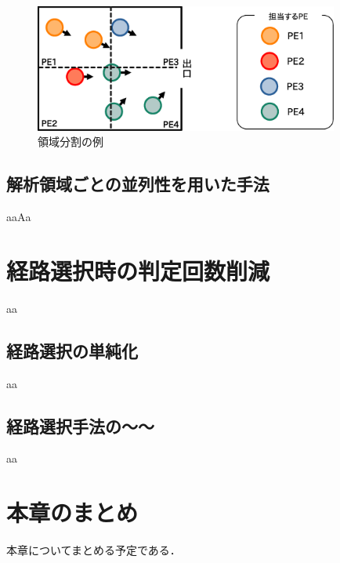 \begin{figure}[hbtp]
 \begin{center}
  \includegraphics[width=10cm,clip]{figure/ryoiki_heiretu.eps}
  \caption{領域分割の例}
  \label{fig:atigenshou}
 \end{center}
\end{figure}


\clearpage

\subsection{解析領域ごとの並列性を用いた手法}
aaAa

\section{経路選択時の判定回数削減}
aa

\subsection{経路選択の単純化}
aa

\subsection{経路選択手法の～～}
aa

\section{本章のまとめ}
本章についてまとめる予定である．


